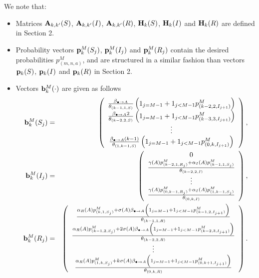 \documentclass[preprint,12pt]{elsarticle}
\begin{document}
\par\noindent We note that:
\begin{itemize}
  \item Matrices ${\bf A}_{k,k'}(S)$, ${\bf A}_{k,k'}(I)$, ${\bf A}_{k,k'}(R)$, ${\bf H}_k(S)$, ${\bf H}_k(I)$ and ${\bf H}_k(R)$ are defined in Section 2.
  \item Probability vectors ${\bf p}^M_k(S_j)$, ${\bf p}^M_k(I_j)$ and ${\bf p}^M_k(R_j)$ contain the desired probabilities $p^M_{(m,n,a)}$, and are structured in a similar
fashion than vectors ${\bf p}_k(S)$, ${\bf p}_k(I)$ and ${\bf p}_k(R)$ in Section 2.
  \item Vectors ${\bf b}^M_k(\cdot)$ are given as follows
\begin{eqnarray*}
 {\bf b}^M_k(S_j) & = & \left(\begin{array}{c}
               \frac{\beta_{\bullet\rightarrow A}}{\theta_{(k-1,1,S)}}\left(1_{j=M-1}+1_{j<M-1}p^M_{(k-2,2,I_{j+1})}\right)\\
\frac{\beta_{\bullet\rightarrow A}2}{\theta_{(k-2,2,S)}}\left(1_{j=M-1}+1_{j<M-1}p^M_{(k-3,3,I_{j+1})}\right)\\
\vdots\\
\frac{\beta_{\bullet\rightarrow A}(k-1)}{\theta_{(1,k-1,S)}}\left(1_{j=M-1}+1_{j<M-1}p^M_{(0,k,I_{j+1})}\right)\\
                         \end{array}\right),\\
{\bf b}^M_k(I_j) & = & \left(\begin{array}{c}
               0\\
\frac{\gamma(A)p^M_{(k-2,1,R_j)}+\alpha_I(A)p^M_{(k-1,1,S_j)}}{\theta_{(k-2,2,I)}}\\
\vdots\\
\frac{\gamma(A)p^M_{(0,k-1,R_j)}+\alpha_I(A)p^M_{(1,k-1,S_j)}}{\theta_{(0,k,I)}}
                         \end{array}\right),\\
{\bf b}^M_k(R_j) & = & \left(\begin{array}{c}
\frac{\alpha_R(A)p^M_{(k,1,S_j)}+\sigma(A)\beta_{\bullet\rightarrow A}\left(1_{j=M-1}+1_{j<M-1}p^M_{(k-1,2,I_{j+1})}\right)}{\theta_{(k-1,1,R)}}\\
\frac{\alpha_R(A)p^M_{(k-1,2,S_j)}+2\sigma(A)\beta_{\bullet\rightarrow A}\left(1_{j=M-1}+1_{j<M-1}p^M_{(k-2,3,I_{j+1})}\right)}{\theta_{(k-2,2,R)}}\\
\vdots\\
\frac{\alpha_R(A)p^M_{(1,k,S_j)}+k\sigma(A)\beta_{\bullet\rightarrow A}\left(1_{j=M-1}+1_{j<M-1}p^M_{(0,k+1,I_{j+1})}\right)}{\theta_{(0,k,R)}}
                         \end{array}\right).
\end{eqnarray*}

\end{itemize}
\end{document}
